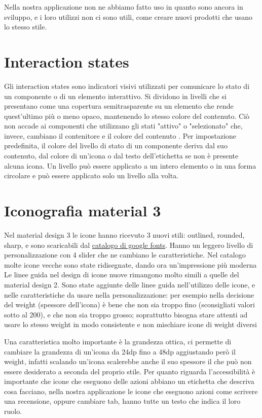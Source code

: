 \documentclass[12pt, a4paper]{report}
\begin{document}
		Nella nostra applicazione non ne abbiamo fatto uso in quanto sono ancora in sviluppo, e i loro utilizzi non ci sono utili, come creare nuovi prodotti che usano lo stesso stile.

	\section{Interaction states}
	Gli interaction states sono indicatori visivi utilizzati per comunicare lo stato di un componente o di un elemento interattivo. Si dividono in livelli che si presentano come una  copertura semitrasparente su un elemento che rende quest'ultimo più o meno opaco, mantenendo lo stesso colore del contenuto.
	Ciò non accade ai componenti che utilizzano gli stati "attivo" o "selezionato" che, invece, cambiano il contenitore e il colore del contenuto .
	Per impostazione predefinita, il colore del livello di stato di un componente deriva dal suo contenuto, dal colore di un'icona o dal testo dell'etichetta se non è presente alcuna icona.
	Un livello può essere applicato a un intero elemento o in una forma circolare e può essere applicato solo un livello alla volta.

	\section{Iconografia material 3}
		Nel material design 3 le icone hanno ricevuto 3 nuovi stili: outlined, rounded, sharp, e sono scaricabili dal \href{https://fonts.google.com/icons}{catalogo di google fonts}. Hanno un leggero livello di personalizzazione con 4 slider che ne cambiano le caratteristiche.
		Nel catalogo molte icone vecche sono state ridisegnate, dando ora un'impressione più moderna
		Le linee guida nel design di icone nuove rimangono molto simili a quelle del material design 2.
		Sono state aggiunte delle linee guida nell'utilizzo delle icone, e nelle caratteristiche da usare nella personalizzazione: per esempio nella decisione del weight (spessore dell'icona) è bene che non sia troppo fino (sconsigliati valori sotto al 200), e che non sia troppo grosso; soprattutto bisogna stare attenti ad usare lo stesso weight in modo consistente e non mischiare icone di weight diversi

		Una caratteristica molto importante è la grandezza ottica, ci permette di cambiare la grandezza di un'icona da 24dp fino a 48dp aggiustando però il weight, infatti scalando un'icona scalerebbe anche il suo spessore il che può non essere desiderato a seconda del proprio stile.
		Per quanto riguarda l'accessibilità è importante che icone che eseguono delle azioni abbiano un etichetta che descriva cosa facciano, nella nostra applicazione le icone che eseguono azioni come scrivere una recensione, oppure cambiare tab, hanno tutte un testo che indica il loro ruolo.
\end{document}
